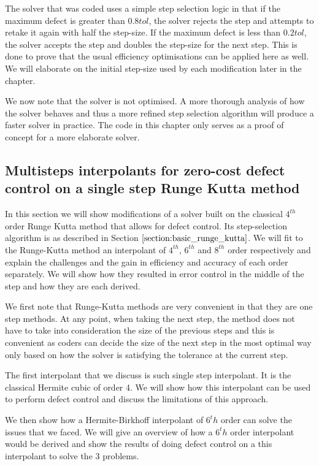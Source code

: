 \documentclass{article}
\begin{document}
The solver that was coded uses a simple step selection logic in that if the maximum defect is greater than $0.8tol$, the solver rejects the step and attempts to retake it again with half the step-size. If the maximum defect is less than $0.2tol$, the solver accepts the step and doubles the step-size for the next step. This is done to prove that the usual efficiency optimisations can be applied here as well. We will elaborate on the initial step-size used by each modification later in the chapter.

We now note that the solver is not optimised. A more thorough analysis of how the solver behaves and thus a more refined step selection algorithm will produce a faster solver in practice. The code in this chapter only serves as a proof of concept for a more elaborate solver. 

\subsection{Multisteps interpolants for zero-cost defect control on a single step Runge Kutta method}
In this section we will show modifications of a solver built on the classical $4^{th}$ order Runge Kutta method that allows for defect control. Its step-selection algorithm is as described in Section $\ref{section:basic_runge_kutta}$. We will fit to the Runge-Kutta method an interpolant of $4^{th}$, $6^{th}$ and $8^{th}$ order respectively and explain the challenges and the gain in efficiency and accuracy of each order separately. We will show how they resulted in error control in the middle of the step and how they are each derived.

We first note that Runge-Kutta methods are very convenient in that they are one step methods. At any point, when taking the next step, the method does not have to take into consideration the size of the previous steps and this is convenient as coders can decide the size of the next step in the most optimal way only based on how the solver is satisfying the tolerance at the current step. 

The first interpolant that we discuss is such single step interpolant. It is the classical Hermite cubic of order 4. We will show how this interpolant can be used to perform defect control and discuss the limitations of this approach. 

We then show how a Hermite-Birkhoff interpolant of $6^th$ order can solve the issues that we faced. We will give an overview of how a $6^th$ order interpolant would be derived and show the results of doing defect control on a this interpolant to solve the 3 problems. 
\end{document}
